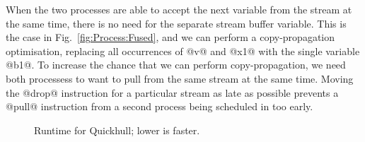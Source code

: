 
When the two processes are able to accept the next variable from the stream at the same time, there is no need for the separate stream buffer variable. This is the case in Fig.~\ref{fig:Process:Fused}, and we can perform a copy-propagation optimisation, replacing all occurrences of @v@ and @x1@ with the single variable @b1@. To increase the chance that we can perform copy-propagation, we need both processess to want to pull from the same stream at the same time. Moving the @drop@ instruction for a particular stream as late as possible prevents a @pull@ instruction from a second process being scheduled in too early.




\begin{figure}
\caption{Runtime for Quickhull; lower is faster.}
\label{fig:bench:quickhull}
\end{figure}




